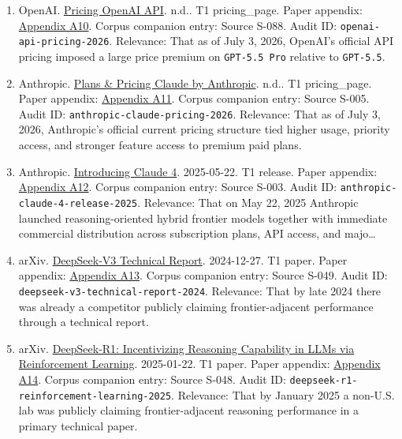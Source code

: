 \documentclass[
  american,
  11pt,
  letterpaper,
]{article}
\begin{document}
\begin{enumerate}
{  Free, Go, Plus, Pro, Business, and Enterprise}. n.d.. T1
  pricing\_page. Paper appendix:
  \hyperref[appendix-a9-chatgpt-plans-free-go-plus-pro-business-and-enterprise]{Appendix
  A9}. Corpus companion entry: Source S-039. Audit ID:
  \texttt{chatgpt-pricing-2026}. Relevance: That as of capture on July
  3, 2026, OpenAI's official ChatGPT plan structure reserved the
  highest-end reasoning access for upper paid tiers rather than offering
  it uniformly acr\ldots{}
\item
  OpenAI. \href{https://developers.openai.com/api/docs/pricing}{Pricing
  \textbar{} OpenAI API}. n.d.. T1 pricing\_page. Paper appendix:
  \hyperref[appendix-a10-pricing-openai-api]{Appendix A10}. Corpus
  companion entry: Source S-088. Audit ID:
  \texttt{openai-api-pricing-2026}. Relevance: That as of July 3, 2026,
  OpenAI's official API pricing imposed a large price premium on
  \texttt{GPT-5.5\ Pro} relative to \texttt{GPT-5.5}.
\item
  Anthropic. \href{https://claude.com/pricing}{Plans \& Pricing
  \textbar{} Claude by Anthropic}. n.d.. T1 pricing\_page. Paper
  appendix:
  \hyperref[appendix-a11-plans-pricing-claude-by-anthropic]{Appendix
  A11}. Corpus companion entry: Source S-005. Audit ID:
  \texttt{anthropic-claude-pricing-2026}. Relevance: That as of July 3,
  2026, Anthropic's official current pricing structure tied higher
  usage, priority access, and stronger feature access to premium paid
  plans.
\item
  Anthropic. \href{https://www.anthropic.com/news/claude-4}{Introducing
  Claude 4}. 2025-05-22. T1 release. Paper appendix:
  \hyperref[appendix-a12-introducing-claude-4]{Appendix A12}. Corpus
  companion entry: Source S-003. Audit ID:
  \texttt{anthropic-claude-4-release-2025}. Relevance: That on May 22,
  2025 Anthropic launched reasoning-oriented hybrid frontier models
  together with immediate commercial distribution across subscription
  plans, API access, and majo\ldots{}
\item
  arXiv. \href{https://arxiv.org/abs/2412.19437}{DeepSeek-V3 Technical
  Report}. 2024-12-27. T1 paper. Paper appendix:
  \hyperref[appendix-a13-deepseek-v3-technical-report]{Appendix A13}.
  Corpus companion entry: Source S-049. Audit ID:
  \texttt{deepseek-v3-technical-report-2024}. Relevance: That by late
  2024 there was already a competitor publicly claiming
  frontier-adjacent performance through a technical report.
\item
  arXiv. \href{https://arxiv.org/abs/2501.12948}{DeepSeek-R1:
  Incentivizing Reasoning Capability in LLMs via Reinforcement
  Learning}. 2025-01-22. T1 paper. Paper appendix:
  \hyperref[appendix-a14-deepseek-r1-incentivizing-reasoning-capability-in-llms-via-reinforcement-learning]{Appendix
  A14}. Corpus companion entry: Source S-048. Audit ID:
  \texttt{deepseek-r1-reinforcement-learning-2025}. Relevance: That by
  January 2025 a non-U.S. lab was publicly claiming frontier-adjacent
  reasoning performance in a primary technical paper.
\end{enumerate}
\end{document}
